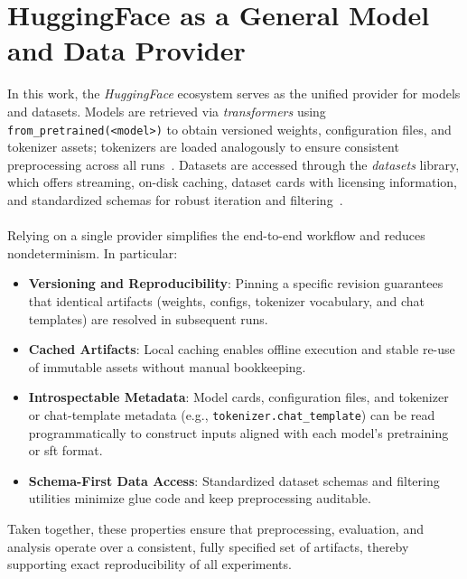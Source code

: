 \section{HuggingFace as a General Model and Data Provider}
\label{sec:hf_provider}
In this work, the \emph{HuggingFace} ecosystem serves as the unified provider for models and datasets. Models are retrieved via \emph{transformers} using \texttt{from\_pretrained(\textless model\textgreater)} to obtain versioned weights, configuration files, and tokenizer assets; tokenizers are loaded analogously to ensure consistent preprocessing across all runs~\cite{wolf-etal-2020-transformers}. Datasets are accessed through the \emph{datasets} library, which offers streaming, on-disk caching, dataset cards with licensing information, and standardized schemas for robust iteration and filtering~\cite{lhoest-etal-2021-datasets}.
\\\\
Relying on a single provider simplifies the end-to-end workflow and reduces nondeterminism. In particular:
\begin{itemize}
    \item \textbf{Versioning and Reproducibility}: Pinning a specific revision guarantees that identical artifacts (weights, configs, tokenizer vocabulary, and chat templates) are resolved in subsequent runs.
    \item \textbf{Cached Artifacts}: Local caching enables offline execution and stable re-use of immutable assets without manual bookkeeping.
    \item \textbf{Introspectable Metadata}: Model cards, configuration files, and tokenizer or chat-template metadata (e.g., \texttt{tokenizer.chat\_template}) can be read programmatically to construct inputs aligned with each model’s pretraining or \acrshort{sft} format.
    \item \textbf{Schema-First Data Access}: Standardized dataset schemas and filtering utilities minimize glue code and keep preprocessing auditable.
\end{itemize}
Taken together, these properties ensure that preprocessing, evaluation, and analysis operate over a consistent, fully specified set of artifacts, thereby supporting exact reproducibility of all experiments.


